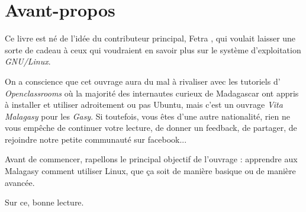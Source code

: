 \chapter*{Avant-propos}

Ce livre est né de l'idée du contributeur principal, Fetra ,
qui voulait laisser une sorte de cadeau à ceux qui voudraient en savoir plus sur
le système d'exploitation \emph{GNU/Linux}.

On a conscience que cet ouvrage aura du mal à rivaliser avec les tutoriels d'
\emph{Openclassrooms} où la majorité des internautes curieux de Madagascar ont
appris à installer et utiliser adroitement ou pas Ubuntu, mais c'est un ouvrage
\emph{Vita Malagasy} pour les \emph{Gasy}. Si toutefois, vous êtes d'une autre
nationalité, rien ne vous empêche de continuer votre lecture, de donner un
feedback, de partager, de rejoindre notre petite communauté sur facebook...

Avant de commencer, rapellons le principal objectif de l'ouvrage : apprendre aux
Malagasy comment utiliser Linux, que ça soit de manière basique ou de manière
avancée.

Sur ce, bonne lecture.
